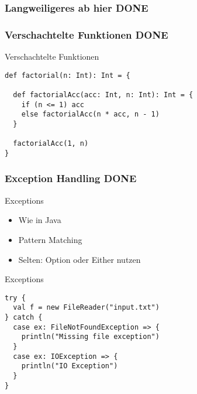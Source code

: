 \documentclass[14pt,aspectratio=169,trans]{beamer} %
\begin{document}


\subsubsection*{Langweiligeres ab hier DONE}


\subsubsection*{Verschachtelte Funktionen DONE}
\begin{frame}[fragile]{}
	\begin{block}{Verschachtelte Funktionen}
		\scriptsize
		\onslide<2->
  \begin{lstlisting}
def factorial(n: Int): Int = {

  def factorialAcc(acc: Int, n: Int): Int = {
    if (n <= 1) acc
    else factorialAcc(n * acc, n - 1)
  }
	
  factorialAcc(1, n)
}
	\end{lstlisting}
	\end{block}
\end{frame}

\subsubsection*{Exception Handling DONE}

\begin{frame}{}
	\begin{block}{Exceptions}
		\begin{itemize}
			\item<2->Wie in Java
			\item<3->Pattern Matching
			\item<4->Selten: Option oder Either nutzen
		\end{itemize}
	\end{block}
	\note{}
\end{frame}

\begin{frame}[fragile]{}
	\begin{block}{Exceptions}
		\scriptsize
		\onslide<2->
  \begin{lstlisting}
try {
  val f = new FileReader("input.txt")
} catch {
  case ex: FileNotFoundException => {
    println("Missing file exception")
  }
  case ex: IOException => {
    println("IO Exception")
  }
}
	\end{lstlisting}
	\end{block}
	\note{}
\end{frame}
\end{document}
